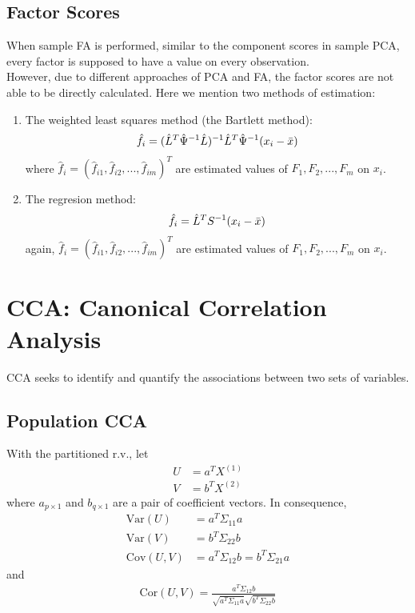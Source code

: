 \documentclass[12pt]{extarticle}
\newcommand{\<}{\langle}
\renewcommand{\>}{\rangle}
\theoremstyle{definition}
\begin{document}
\subsection{Factor Scores}
When sample FA is performed, similar to the component scores in sample PCA, every factor is supposed to have a value on every observation.\\
However, due to different approaches of PCA and FA, the factor scores are not able to be directly calculated. Here we mention two methods of estimation:
\begin{enumerate}
    \item The weighted least squares method (the Bartlett method):
    \begin{align*}
        \hat{f}_i =(\hat{L}^T \hat{\Psi}^{-1} \hat{L})^{-1} \hat{L}^T \hat{\Psi}^{-1} (x_i -\Bar{x})
    \end{align*}
    where $\hat{f}_i = (\hat{f}_{i1},\hat{f}_{i2},...,\hat{f}_{im})^T$ are estimated values of $F_1,F_2,...,F_m$ on $x_i$.
    \item The regresion method:
    \begin{align*}
        \hat{f}_i = \hat{L}^T S^{-1} (x_i -\Bar{x})
    \end{align*}
    again, $\hat{f}_i = (\hat{f}_{i1},\hat{f}_{i2},...,\hat{f}_{im})^T$ are estimated values of $F_1,F_2,...,F_m$ on $x_i$.
\end{enumerate}

\newpage
\section{CCA: Canonical Correlation Analysis}
CCA seeks to identify and quantify the associations between two sets of variables.
\subsection{Population CCA}
With the partitioned r.v., let
\begin{align*}
    U &= a^T X^{(1)}\\
    V &= b^T X^{(2)}
\end{align*}
where $a_{p\times 1}$ and $b_{q\times 1}$ are a pair of coefficient vectors. In consequence,
\begin{align*}
    \text{Var}(U) &= a^T \Sigma_{11} a\\
    \text{Var}(V) &= b^T \Sigma_{22} b\\
    \text{Cov}(U,V) &= a^T \Sigma_{12} b = b^T \Sigma_{21} a
\end{align*}
and
\begin{align*}
    \text{Cor}(U,V) = \frac{a^T \Sigma_{12} b}{\sqrt{a^T \Sigma_{11} a}\sqrt{b^T \Sigma_{22} b}}
\end{align*}
\end{document}
